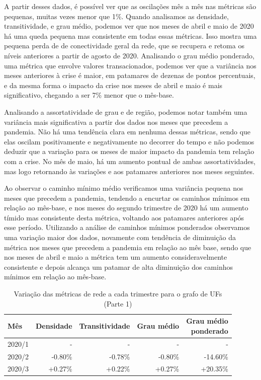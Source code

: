 A partir desses dados, é possível ver que as oscilações mês a mês nas métricas são pequenas, muitas vezes menor que 1\%. Quando analisamos as densidade, transitividade, e grau médio, podemos ver que nos meses de abril e maio de 2020 há uma queda pequena mas consistente em todas essas métricas. Isso mostra uma pequena perda de de conectividade geral da rede, que se recupera e retoma os níveis anteriores a partir de agosto de 2020. Analisando o grau médio ponderado, uma métrica que envolve valores transacionados, podemos ver que a variância nos meses anteriores à crise é maior, em patamares de dezenas de pontos percentuais, e da mesma forma o impacto da crise nos meses de abril e maio é mais significativo, chegando a ser 7\% menor que o mês-base.

Analisando a assortatividade de grau e de região, podemos notar também uma variância mais significativa a partir dos dados nos meses que precedem a pandemia. Não há uma tendência clara em nenhuma dessas métricas, sendo que elas oscilam positivamente e negativamente no decorrer do tempo e não podemos deduzir que a variação para os meses de maior impacto da pandemia tem relação com a crise. No mês de maio, há um aumento pontual de ambas assortatividades, mas logo retornando às variações e aos patamares anteriores nos meses seguintes.

Ao observar o caminho mínimo médio verificamos uma variância pequena nos meses que precedem a pandemia, tendendo a encurtar os caminhos mínimos em relação ao mês-base, e nos meses do segundo trimestre de 2020 há um aumento tímido mas consistente desta métrica, voltando aos patamares anteriores após esse período. Utilizando a análise de caminhos mínimos ponderados observamos uma variação maior dos dados, novamente com tendência de diminuição da métrica nos meses que precedem a pandemia em relação ao mês base, sendo que nos meses de abril e maio a métrica tem um aumento consideravelmente consistente e depois alcança um patamar de alta diminuição dos caminhos mínimos em relação ao mês-base.

\begin{table}[htb]
\centering
\caption{Variação das métricas de rede a cada trimestre para o grafo de UFs (Parte 1)}
\label{tab:metricas-redes-pandemia:grafo-trimestral-por-uf1}
\begin{tabular}{l|rrrr}
\toprule
Mês & Densidade & Transitividade & Grau médio & \shortstack{Grau médio\\ponderado} \\
\midrule
2020/1 & - & - & - & - \\
2020/2 & -0.80\% & -0.78\% & -0.80\% & -14.60\% \\
2020/3 & +0.27\% & +0.22\% & +0.27\% & +20.35\% \\
\bottomrule
\end{tabular}
\fdadospesquisa
\end{table}

